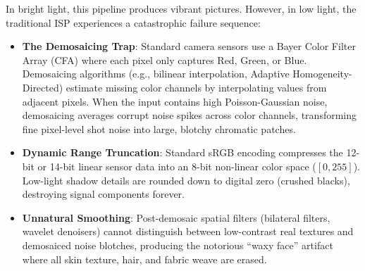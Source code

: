 In bright light, this pipeline produces vibrant pictures. However, in low light, the traditional ISP experiences a catastrophic failure sequence:
\begin{itemize}
    \item \textbf{The Demosaicing Trap}: Standard camera sensors use a Bayer Color Filter Array (CFA) where each pixel only captures Red, Green, or Blue. Demosaicing algorithms (e.g., bilinear interpolation, Adaptive Homogeneity-Directed) estimate missing color channels by interpolating values from adjacent pixels. When the input contains high Poisson-Gaussian noise, demosaicing averages corrupt noise spikes across color channels, transforming fine pixel-level shot noise into large, blotchy chromatic patches.
    \item \textbf{Dynamic Range Truncation}: Standard sRGB encoding compresses the 12-bit or 14-bit linear sensor data into an 8-bit non-linear color space ($[0, 255]$). Low-light shadow details are rounded down to digital zero (crushed blacks), destroying signal components forever.
    \item \textbf{Unnatural Smoothing}: Post-demosaic spatial filters (bilateral filters, wavelet denoisers) cannot distinguish between low-contrast real textures and demosaiced noise blotches, producing the notorious ``waxy face'' artifact where all skin texture, hair, and fabric weave are erased.
\end{itemize}

